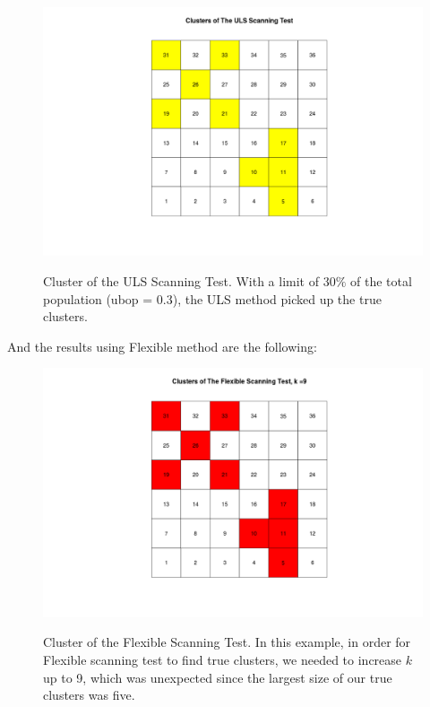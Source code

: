 \documentclass[12pt]{article}
\begin{document}
\begin{figure}[!ht]
	
	\centering
	\includegraphics[scale=0.2]{Ex2_ULS}\\
	\caption{Cluster of the ULS Scanning Test. With a limit of $30 \% $  of the total population (ubop = 0.3), the ULS method picked up the true clusters.\label{f:gull}}
	
\end{figure}



\newpage


And the results using Flexible method are the following:\\

\begin{figure}[!ht]
\centering
\includegraphics[scale=0.3]{Ex2_Flexible}\\
\caption{Cluster of the Flexible Scanning Test. In this example, in order for Flexible scanning test to find true clusters, we needed to increase $k$ up to 9, which was unexpected since the largest size of our true clusters was five. \label{f:gull}}

\end{figure}
\end{document}
